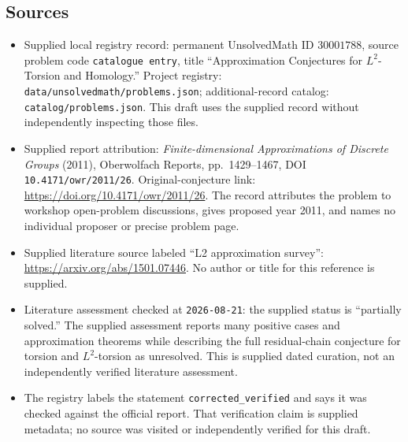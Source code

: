 \documentclass[11pt]{article}
\begin{document}
\subsection{Sources}
\begin{itemize}
\item Supplied local registry record: permanent UnsolvedMath ID \(30001788\), source problem code \texttt{catalogue entry}, title ``Approximation Conjectures for \(L^2\)-Torsion and Homology.'' Project registry: \texttt{data/unsolvedmath/problems.json}; additional-record catalog: \texttt{catalog/problems.json}. This draft uses the supplied record without independently inspecting those files.
\item Supplied report attribution: \emph{Finite-dimensional Approximations of Discrete Groups} (2011), Oberwolfach Reports, pp.\ 1429--1467, DOI \texttt{10.4171/owr/2011/26}. Original-conjecture link: \url{https://doi.org/10.4171/owr/2011/26}. The record attributes the problem to workshop open-problem discussions, gives proposed year 2011, and names no individual proposer or precise problem page.
\item Supplied literature source labeled ``L2 approximation survey'': \url{https://arxiv.org/abs/1501.07446}. No author or title for this reference is supplied.
\item Literature assessment checked at \texttt{2026-08-21}: the supplied status is ``partially solved.'' The supplied assessment reports many positive cases and approximation theorems while describing the full residual-chain conjecture for torsion and \(L^2\)-torsion as unresolved. This is supplied dated curation, not an independently verified literature assessment.
\item The registry labels the statement \texttt{corrected\_verified} and says it was checked against the official report. That verification claim is supplied metadata; no source was visited or independently verified for this draft.
\end{itemize}
\end{document}
